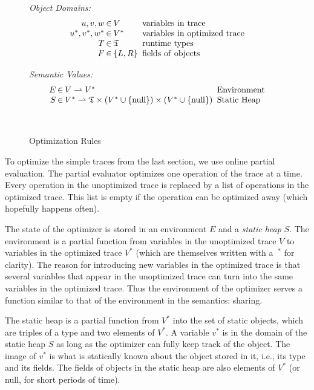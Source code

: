 \documentclass{sigplanconf}
\newcommand\ie{i.e.,\xspace}
\begin{document}
\begin{figure}
\begin{center}
\begin{minipage}[b]{7 cm}
\emph{Object Domains:}
$$\setlength\arraycolsep{0.1em}
 \begin{array}{rcll}
    u,v,w & \in & V & \mathrm{\ variables\ in\ trace}\\
    u^*,v^*,w^* & \in & V^* & \mathrm{\ variables\ in\ optimized\ trace}\\
    T & \in & \mathfrak{T} & \mathrm{\ runtime\ types}\\
    F & \in & \left\{ L,R\right\} & \mathrm{\ fields\ of\ objects}\\
 \end{array}
$$
\end{minipage}
\begin{minipage}[b]{5 cm}
\emph{Semantic Values:}
$$\setlength\arraycolsep{0.1em}
 \begin{array}{rcll}
    E & \in & V\rightharpoonup V^* & \mathrm{\ Environment}\\
    S & \in & V^*\rightharpoonup\mathfrak{T}\times(V^*\cup \{ \mathrm{null} \})\times (V^*\cup \{ \mathrm{null}\} ) & \mathrm{\ Static\ Heap}\\
    \\
    \\
 \end{array}
$$
\end{minipage}
\end{center}
\caption{Optimization Rules}
\label{fig:optimization}
\end{figure}

To optimize the simple traces from the last section, we use online partial
evaluation. The partial evaluator optimizes one operation of the trace at a
time. Every operation in the unoptimized trace is replaced by a list of
operations in the optimized trace. This list is empty if the operation
can be optimized away (which hopefully happens often).

The state of the optimizer is stored in an environment $E$ and a \emph{static
heap} $S$. The environment is a partial function from variables in the
unoptimized trace $V$ to variables in the optimized trace $V^*$ (which are
themselves written with a
$\ ^*$ for clarity). The reason for introducing new variables in the optimized
trace is that several variables that appear in the unoptimized trace can turn
into the same variables in the optimized trace. Thus the environment of the
optimizer serves a function similar to that of the environment in the semantics: sharing.

The static heap is a partial function from $V^*$ into the
set of static objects, which are triples of a type and two elements of $V^*$.
A variable $v^*$ is in the domain of the static heap $S$ as long as the
optimizer can fully keep track of the object. The image of $v^*$ is what is
statically known about the object stored in it, \ie its type and its fields. The
fields of objects in the static heap are also elements of $V^*$ (or null, for
short periods of time).
\end{document}
